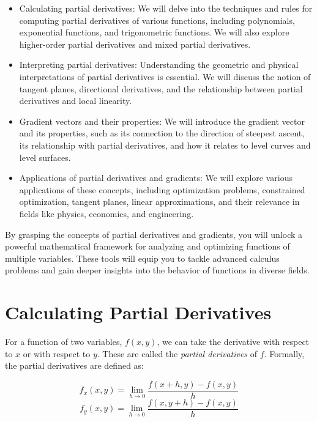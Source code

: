 \begin{itemize}
\item Calculating partial derivatives: We will delve into the
  techniques and rules for computing partial derivatives of various
  functions, including polynomials, exponential functions, and
  trigonometric functions. We will also explore higher-order partial
  derivatives and mixed partial derivatives.

\item Interpreting partial derivatives: Understanding the geometric
  and physical interpretations of partial derivatives is essential. We
  will discuss the notion of tangent planes, directional derivatives,
  and the relationship between partial derivatives and local
  linearity.

\item Gradient vectors and their properties: We will introduce the
  gradient vector and its properties, such as its connection to the
  direction of steepest ascent, its relationship with partial
  derivatives, and how it relates to level curves and level surfaces.

\item Applications of partial derivatives and gradients: We will
  explore various applications of these concepts, including
  optimization problems, constrained optimization, tangent planes,
  linear approximations, and their relevance in fields like physics,
  economics, and engineering.
\end{itemize}

By grasping the concepts of partial derivatives and gradients, you
will unlock a powerful mathematical framework for analyzing and
optimizing functions of multiple variables. These tools will equip you
to tackle advanced calculus problems and gain deeper insights into the
behavior of functions in diverse fields.

\section{Calculating Partial Derivatives}
For a function of two variables, $f(x,y)$, we can take the derivative with 
respect to $x$ or with respect to $y$. These are called the \textit{partial 
derivatives} of $f$. Formally, the partial 
derivatives are defined as:

\begin{mdframed}[style = important, frametitle = {Limit Definition of Partial 
Derivatives}]
$$f_x(x, y) = \lim_{h \to 0} \frac{f(x + h, y) - f(x, y)}{h}$$
$$f_y(x, y) = \lim_{h \to 0} \frac{f(x, y + h) - f(x, y)}{h}$$
\end{mdframed}


